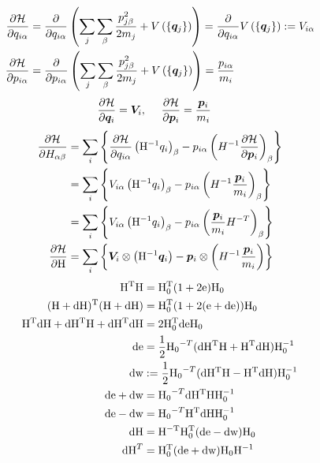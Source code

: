 \documentclass[11pt,a4paper,uplatex]{jsarticle}
\begin{document}
\begin{align}
    \frac{\partial {\cal H}}{\partial q_{i \alpha}} &= \frac{\partial}{\partial q_{i \alpha}} \left( \sum_{j} \sum_{\beta}\frac{p_{j \beta}^{2}}{2m_{j}} + V \left(\{\bm{q}_{j}\}\right)\right) 
    = \frac{\partial}{\partial q_{i \alpha}} V \left(\{\bm{q}_{j}\}\right) 
    := V_{i \alpha} \\
    \frac{\partial {\cal H}}{\partial p_{i \alpha}} &= \frac{\partial}{\partial p_{i \alpha}} \left( \sum_{j} \sum_{\beta}\frac{p_{j \beta}^{2}}{2m_{j}} + V \left(\{\bm{q}_{j}\}\right)\right) 
    = \frac{p_{i \alpha}}{m_{i}}
\end{align}
\begin{align}
    \frac{\partial {\cal H}}{\partial \bm{q}_{i}} &= \bm{V}_{i} ,  \ \ \ \  
    \frac{\partial {\cal H}}{\partial \bm{p}_{i}} = \frac{\bm{p}_{i}}{m_{i}}
\end{align}
\begin{align}
    \frac{\partial {\cal H}}{\partial H_{\alpha \beta}} 
    &= \sum_{i} \left\{ \frac{\partial {\cal H}}{\partial q_{i \alpha}} \left({\rm H}^{-1} q_{i}\right)_{\beta}
    -  p_{i \alpha} \left( H^{-1} \frac{\partial {\cal H}}{\partial \bm{p}_{i}}  \right)_{\beta} \right\} \\
    &= \sum_{i} \left\{ V_{i \alpha} \left({\rm H}^{-1} q_{i}\right)_{\beta}
    -  p_{i \alpha} \left( H^{-1}\frac{\bm{p}_{i}}{m_{i}}  \right)_{\beta} \right\} \\
    &= \sum_{i} \left\{ V_{i \alpha} \left({\rm H}^{-1} q_{i}\right)_{\beta}
    -  p_{i \alpha} \left( \frac{\bm{p}_{i}}{m_{i}} H^{-T} \right)_{\beta} \right\}  \\
    \frac{\partial {\cal H}}{\partial {\rm H}} &= \sum_{i}\left\{ \bm{V}_{i} \otimes   \left({\rm H}^{-1} \bm{q}_{i}\right) 
    - \bm{p}_{i} \otimes \left( H^{-1}\frac{\bm{p}_{i}}{m_{i}}  \right) \right\}     
\end{align}
\begin{align}
    {\rm H^{T} H} &= {\rm H_{0}^{T}} ( 1 + 2 {\rm e}) {\rm H_{0} } \\
    {\rm (H + dH)^{T} (H+dH)} &= {\rm H_{0}^{T}} (1 + 2({\rm e+de })) {\rm H_{0} } \\
    {\rm H^{T} dH + dH^{T} H + dH^{T} dH } &= 2 {\rm H_{0}^{T} de H_{0} }\\
    {\rm de} &= \frac{1}{2} {\rm H_{0}}^{-T} ( {\rm dH^{T} H + H^{T} dH } ) {\rm H_{0}^{-1}}\\
    {\rm dw} &:= \frac{1}{2} {\rm H_{0}}^{-T} ( {\rm  dH^{T} H - H^{T} dH } ) {\rm H_{0}^{-1}} \\
    {\rm de + dw} &= {\rm H_{0}}^{-T} {\rm dH^{T} H  H_{0}^{-1} } \\
    {\rm de - dw} &= {\rm H_{0}}^{-T} {\rm H^{T} dH  H_{0}^{-1} } \\
    {\rm dH} &= {\rm H^{-T} H_{0}^{T}} ({\rm de - dw}) {\rm H_{0}} \\
    {\rm dH}^{T} &= {\rm H_{0}^{T}}({\rm de + dw}) {\rm H_{0}} {\rm H}^{-1}\\
\end{align}
\end{document}
